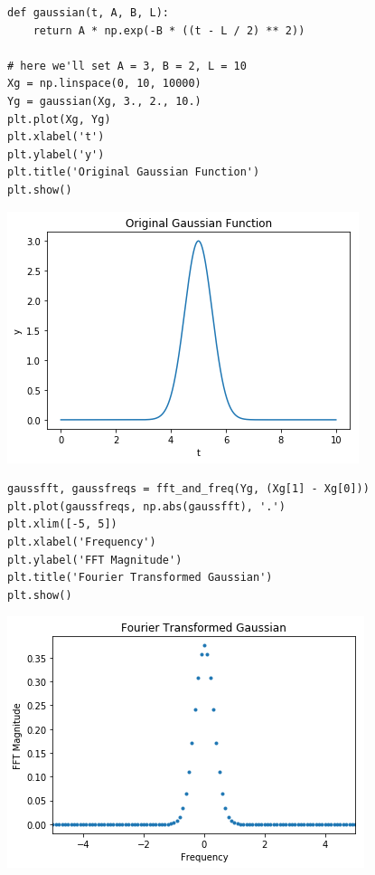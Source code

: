 \documentclass[11pt]{article}
\begin{document}
\begin{verbatim}
def gaussian(t, A, B, L):
    return A * np.exp(-B * ((t - L / 2) ** 2))

# here we'll set A = 3, B = 2, L = 10
Xg = np.linspace(0, 10, 10000)
Yg = gaussian(Xg, 3., 2., 10.)
plt.plot(Xg, Yg)
plt.xlabel('t')
plt.ylabel('y')
plt.title('Original Gaussian Function')
plt.show()
\end{verbatim}

\includegraphics[width=.9\linewidth]{./obipy-resources/17087uqW.png}

\begin{verbatim}
gaussfft, gaussfreqs = fft_and_freq(Yg, (Xg[1] - Xg[0]))
plt.plot(gaussfreqs, np.abs(gaussfft), '.')
plt.xlim([-5, 5])
plt.xlabel('Frequency')
plt.ylabel('FFT Magnitude')
plt.title('Fourier Transformed Gaussian')
plt.show()
\end{verbatim}

\includegraphics[width=.9\linewidth]{./obipy-resources/1708770c.png}
\end{document}
